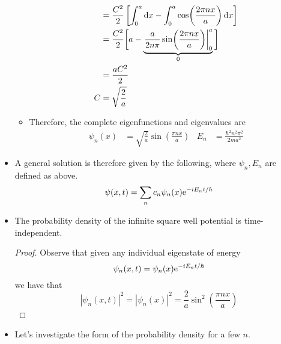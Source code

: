 \documentclass[../notes.tex]{subfiles}
\begin{document}
\begin{itemize}
\begin{itemize}
\begin{align*}
            &= \frac{C^2}{2}\left[ \int_0^a\dd{x}-\int_0^a\cos(\frac{2\pi nx}{a})\dd{x} \right]\\
            &= \frac{C^2}{2}\bigg[ a-\underbrace{\eval{\frac{a}{2n\pi}\sin(\frac{2\pi nx}{a})}_0^a}_0 \bigg]\\
            &= \frac{aC^2}{2}\\
            C &= \sqrt{\frac{2}{a}}
        \end{align*}
        \item Therefore, the complete eigenfunctions and eigenvalues are
        \begin{align*}
            \psi_n(x) &= \sqrt{\frac{2}{a}}\sin(\frac{\pi nx}{a})&
            E_n &= \frac{\hbar^2n^2\pi^2}{2ma^2}
        \end{align*}
    \end{itemize}
    \item A general solution is therefore given by the following, where $\psi_n,E_n$ are defined as above.
    \begin{equation*}
        \psi(x,t) = \sum_nc_n\psi_n(x)\e[-iE_nt/\hbar]
    \end{equation*}
    \item The probability density of the infinite square well potential is time-independent.
    \begin{proof}
        Observe that given any individual eigenstate of energy
        \begin{equation*}
            \psi_n(x,t) = \psi_n(x)\e[-iE_nt/\hbar]
        \end{equation*}
        we have that
        \begin{equation*}
            |\psi_n(x,t)|^2 = |\psi_n(x)|^2
            = \frac{2}{a}\sin^2\left( \frac{\pi nx}{a} \right)
        \end{equation*}
    \end{proof}
    \item Let's investigate the form of the probability density for a few $n$.
    \begin{figure}[H]
        \centering
        \begin{subfigure}[b]{0.19\linewidth}
            \centering
\end{subfigure}
\end{figure}
\end{itemize}
\end{document}
